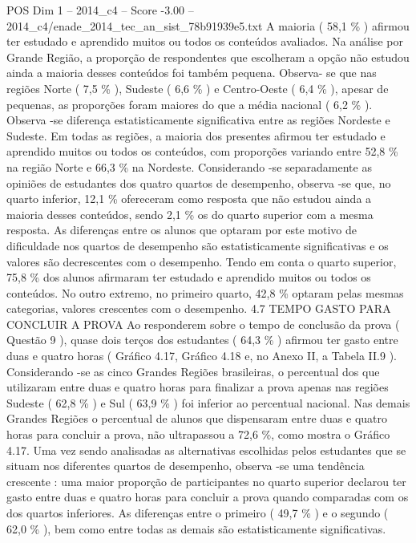\begin{textsample}{POS Dim 1 – 2014\_c4 – Score -3.00 – 2014\_c4/enade\_2014\_tec\_an\_sist\_78b91939e5.txt}
A maioria ( 58,1 \% ) afirmou ter estudado e aprendido muitos ou todos os conteúdos avaliados.
Na análise por Grande Região, a proporção de respondentes que escolheram a opção não estudou ainda a maioria desses conteúdos foi também pequena.
Observa- se que nas regiões Norte ( 7,5 \% ), Sudeste ( 6,6 \% ) e Centro-Oeste ( 6,4 \% ), apesar de pequenas, as proporções foram maiores do que a média nacional ( 6,2 \% ).
Observa -se diferença estatisticamente significativa entre as regiões Nordeste e Sudeste.
Em todas as regiões, a maioria dos presentes afirmou ter estudado e aprendido muitos ou todos os conteúdos, com proporções variando entre 52,8 \% na região Norte e 66,3 \% na Nordeste.
Considerando -se separadamente as opiniões de estudantes dos quatro quartos de desempenho, observa -se que, no quarto inferior, 12,1 \% ofereceram como resposta que não estudou ainda a maioria desses conteúdos, sendo 2,1 \% os do quarto superior com a mesma resposta.
As diferenças entre os alunos que optaram por este motivo de dificuldade nos quartos de desempenho são estatisticamente significativas e os valores são decrescentes com o desempenho.
Tendo em conta o quarto superior, 75,8 \% dos alunos afirmaram ter estudado e aprendido muitos ou todos os conteúdos.
No outro extremo, no primeiro quarto, 42,8 \% optaram pelas mesmas categorias, valores crescentes com o desempenho. 4.7 TEMPO GASTO PARA CONCLUIR A PROVA Ao responderem sobre o tempo de conclusão da prova ( Questão 9 ), quase dois terços dos estudantes ( 64,3 \% ) afirmou ter gasto entre duas e quatro horas ( Gráfico 4.17, Gráfico 4.18 e, no Anexo II, a Tabela II.9 ).
Considerando -se as cinco Grandes Regiões brasileiras, o percentual dos que utilizaram entre duas e quatro horas para finalizar a prova apenas nas regiões Sudeste ( 62,8 \% ) e Sul ( 63,9 \% ) foi inferior ao percentual nacional.
Nas demais Grandes Regiões o percentual de alunos que dispensaram entre duas e quatro horas para concluir a prova, não ultrapassou a 72,6 \%, como mostra o Gráfico 4.17.
Uma vez sendo analisadas as alternativas escolhidas pelos estudantes que se situam nos diferentes quartos de desempenho, observa -se uma tendência crescente : uma maior proporção de participantes no quarto superior declarou ter gasto entre duas e quatro horas para concluir a prova quando comparadas com os dos quartos inferiores.
As diferenças entre o primeiro ( 49,7 \% ) e o segundo ( 62,0 \% ), bem como entre todas as demais são estatisticamente significativas.

\end{textsample}
